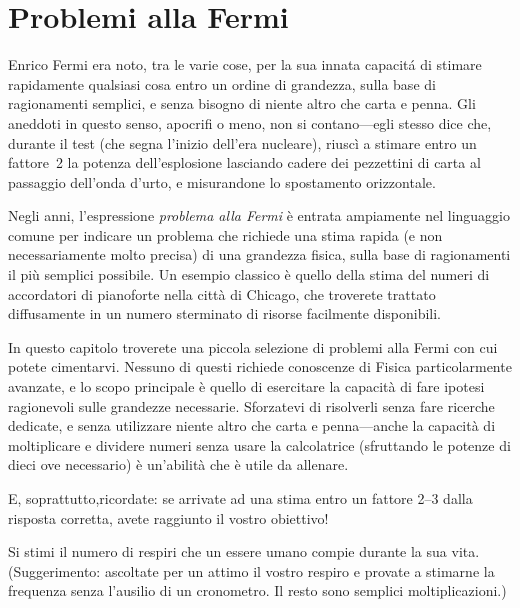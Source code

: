 \chapter{Problemi alla Fermi}

Enrico Fermi era noto, tra le varie cose, per la sua innata capacit\'a di stimare
rapidamente qualsiasi cosa entro un ordine di grandezza, sulla base di ragionamenti
semplici, e senza bisogno di niente altro che carta e penna. Gli aneddoti in
questo senso, apocrifi o meno, non si contano---egli stesso dice che, durante
il test  (che segna l'inizio dell'era nucleare), riuscì a stimare
entro un fattore~2 la potenza dell'esplosione lasciando cadere dei pezzettini
di carta al passaggio dell'onda d'urto, e misurandone lo spostamento orizzontale.

Negli anni, l'espressione \emph{problema alla Fermi} \`e entrata ampiamente nel
linguaggio comune per indicare un problema che richiede una stima rapida
(e non necessariamente molto precisa) di una grandezza fisica, sulla base di
ragionamenti il pi\`u semplici possibile. Un esempio classico \`e quello della
stima del numeri di accordatori di pianoforte nella citt\`a di Chicago, che troverete
trattato diffusamente in un numero sterminato di risorse facilmente disponibili.

In questo capitolo troverete una piccola selezione di problemi alla Fermi con cui
potete cimentarvi. Nessuno di questi richiede conoscenze di Fisica particolarmente
avanzate, e lo scopo principale \`e quello di esercitare la capacit\`a di fare
ipotesi ragionevoli sulle grandezze necessarie. Sforzatevi di risolverli senza
fare ricerche dedicate, e senza utilizzare niente altro che carta e penna---anche
la capacit\`a di moltiplicare e dividere numeri senza usare la calcolatrice
(sfruttando le potenze di dieci ove necessario) \`e un'abilità che \`e utile da
allenare.

E, soprattutto,ricordate: se arrivate ad una stima entro un fattore 2--3 dalla
risposta corretta, avete raggiunto il vostro obiettivo!


\begin{exercise}

Si stimi il numero di respiri che un essere umano compie durante la sua vita.
(Suggerimento: ascoltate per un attimo il vostro respiro e provate a stimarne la
frequenza senza l'ausilio di un cronometro. Il resto sono semplici moltiplicazioni.)

\end{exercise}


